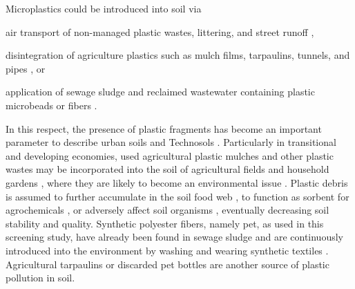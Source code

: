 Microplastics could be introduced into soil via
\begin{enumerate*}
	\item air transport of non-managed plastic wastes, littering, and street runoff \citep{DrisSynthetic2016,BlasingPlastics2018},
	\item disintegration of agriculture plastics such as mulch films, tarpaulins, tunnels, and pipes \citep{LambertOccurrence2014}, or
	\item application of sewage sludge and reclaimed wastewater containing plastic microbeads or
	fibers \citep{BlasingPlastics2018,ZubrisSynthetic2005}.
\end{enumerate*}
In this respect, the presence of plastic fragments has become an important parameter to describe urban soils and Technosols \citep{RilligMicroplastic2012,NizzettoAre2016}. Particularly in transitional and developing economies, used agricultural plastic mulches and other plastic wastes may be incorporated into the soil of agricultural fields \citep{DuisMicroplastics2016} and household gardens \citep{vanderWalHuertos2011}, where they are likely to become an environmental issue \citep{SintimBiodegradable2017}. Plastic debris is assumed to further accumulate in the soil food web \citep{RilligMicroplastic2012}, to function as sorbent for agrochemicals \citep{RamosPolyethylene2015}, or adversely affect soil organisms \citep{KirsteinDangerous2016}, eventually decreasing soil stability and quality.
Synthetic polyester fibers, namely \ac{pet}, as used in this screening study, have already been found in sewage sludge \citep{ZubrisSynthetic2005} and are continuously introduced into the environment by washing and wearing synthetic textiles \citep{PircEmissions2016}. Agricultural tarpaulins or discarded \ac{pet} bottles are another source of plastic pollution in soil.

